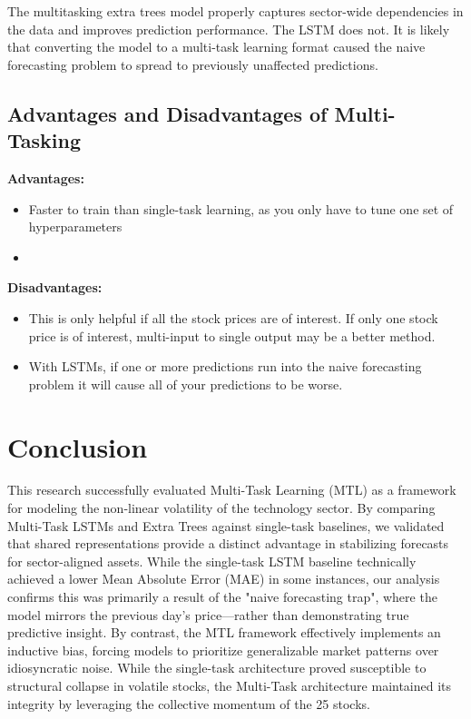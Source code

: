 \documentclass[conference]{IEEEtran}
\begin{document}
The multitasking extra trees model properly captures sector-wide dependencies in the data and improves
prediction performance. The LSTM does not. It is likely that converting the model to a multi-task
learning format caused the naive forecasting problem to spread to previously unaffected predictions.

\subsection{Advantages and Disadvantages of Multi-Tasking}
\textbf{Advantages:}
    \begin{itemize}
        \item Faster to train than single-task learning, as you only have to tune one set of  
              hyperparameters
        \item 
    \end{itemize}
\textbf{Disadvantages:}
    \begin{itemize}
        \item This is only helpful if all the stock prices are of interest. If only one stock price is of interest, 
                multi-input to single output may be a better method.
        \item With LSTMs, if one or more predictions run into the naive forecasting problem it will cause all of your
                predictions to be worse.
    \end{itemize}
\section{Conclusion}
This research successfully evaluated Multi-Task Learning (MTL) as a framework for modeling the non-linear volatility of the technology sector. 
By comparing Multi-Task LSTMs and Extra Trees against single-task baselines, we validated that shared representations provide a distinct advantage 
in stabilizing forecasts for sector-aligned assets. While the single-task LSTM baseline technically achieved a lower Mean Absolute Error (MAE) in some instances, 
our analysis confirms this was primarily a result of the "naive forecasting trap", where the model mirrors the previous day's price—rather than demonstrating true predictive insight. 
By contrast, the MTL framework effectively implements an inductive bias, forcing models to prioritize generalizable market patterns over idiosyncratic noise. 
While the single-task architecture proved susceptible to structural collapse in volatile stocks, the Multi-Task architecture maintained its integrity by leveraging the collective momentum of the 25 stocks.
\end{document}
